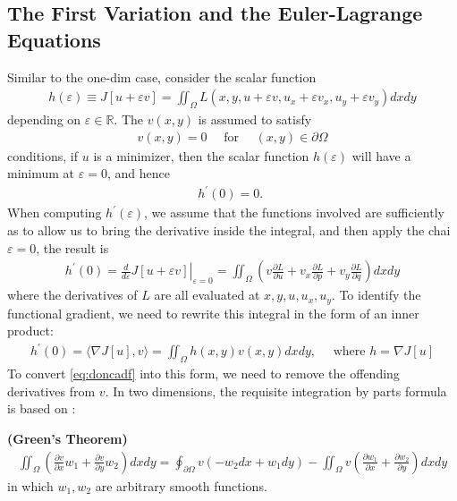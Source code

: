 \documentclass{article}
\newcommand{\bfs}[1]{\textbf{({#1}) }}
\begin{document}
\subsection{The First Variation and the Euler-Lagrange Equations}
Similar to the one-dim case, consider the scalar function
\begin{align}
h(\varepsilon) \equiv J[u+\varepsilon v]=\iint_{\Omega} L\left(x, y, u+\varepsilon v, u_{x}+\varepsilon v_{x}, u_{y}+\varepsilon v_{y}\right) d x d y\label{eq:dojancfadf}
\end{align}
depending on $\varepsilon \in \mathbb{R}$. The  $v(x, y)$ is assumed to satisfy  \begin{align*} v(x, y)=0 \quad \text { for } \quad(x, y) \in \partial \Omega \end{align*} conditions, if $u$ is a minimizer, then the scalar function $h(\varepsilon)$ will have a minimum at $\varepsilon=0$, and hence
\begin{align*}
h^{\prime}(0)=0 \text {. }
\end{align*}
When computing $h^{\prime}(\varepsilon)$, we assume that the functions involved are sufficiently as to allow us to bring the derivative inside the integral, and then apply the chai $\varepsilon=0$, the result is
\begin{align} h^{\prime}(0)=\left.\frac{d}{d \varepsilon} J[u+\varepsilon v]\right|_{\varepsilon=0}=\iint_{\Omega}\left(v \frac{\partial L}{\partial u}+v_{x} \frac{\partial L}{\partial p}+v_{y} \frac{\partial L}{\partial q}\right) d x d y \label{eq:doncadf}
\end{align}
where the derivatives of $L$ are all evaluated at $x, y, u, u_{x}, u_{y} .$ To identify the functional gradient, we need to rewrite this integral in the form of an inner product: \begin{align*} h^{\prime}(0)=\langle\nabla J[u], v\rangle=\iint_{\Omega} h(x, y) v(x, y) d x d y, \quad \text { where } h=\nabla J[u] \end{align*}
To convert \cref{eq:doncadf} into this form, we need to remove the offending derivatives from $v$. In two dimensions, the requisite integration by parts formula is based on :
\begin{thma}\bfs{Green's Theorem}\label{thm:idnacc}
\begin{align*}
\iint_{\Omega}\left(\frac{\partial v}{\partial x} w_{1}+\frac{\partial v}{\partial y} w_{2}\right) d x d y=\oint_{\partial \Omega} v\left(-w_{2} d x+w_{1} d y\right)-\iint_{\Omega} v\left(\frac{\partial w_{1}}{\partial x}+\frac{\partial w_{2}}{\partial y}\right) d x d y
\end{align*}
in which $w_{1}, w_{2}$ are arbitrary smooth functions. 
\end{thma}
\end{document}
